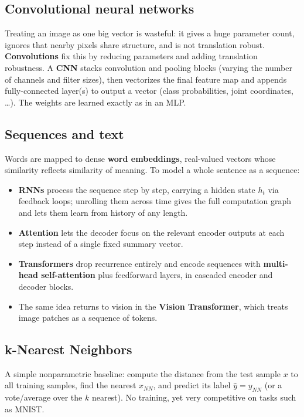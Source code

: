 \subsection{Convolutional neural networks}
Treating an image as one big vector is wasteful: it gives a huge parameter
count, ignores that nearby pixels share structure, and is not translation
robust. \textbf{Convolutions} fix this by reducing parameters and adding
translation robustness. A \textbf{CNN} stacks convolution and pooling blocks
(varying the number of channels and filter sizes), then vectorizes the final
feature map and appends fully-connected layer(s) to output a vector (class
probabilities, joint coordinates, \dots). The weights are learned exactly as in
an MLP.

\subsection{Sequences and text}
Words are mapped to dense \textbf{word embeddings}, real-valued vectors whose
similarity reflects similarity of meaning. To model a whole sentence as a
sequence:
\begin{itemize}
  \item \textbf{RNNs} process the sequence step by step, carrying a hidden state
  $h_t$ via feedback loops; unrolling them across time gives the full
  computation graph and lets them learn from history of any length.
  \item \textbf{Attention} lets the decoder focus on the relevant encoder
  outputs at each step instead of a single fixed summary vector.
  \item \textbf{Transformers} drop recurrence entirely and encode sequences with
  \textbf{multi-head self-attention} plus feedforward layers, in cascaded
  encoder and decoder blocks.
  \item The same idea returns to vision in the \textbf{Vision Transformer}, which
  treats image patches as a sequence of tokens.
\end{itemize}

\subsection{k-Nearest Neighbors}
A simple nonparametric baseline: compute the distance from the test sample $x$
to all training samples, find the nearest $x_{NN}$, and predict its label
$\hat{y} = y_{NN}$ (or a vote/average over the $k$ nearest). No training, yet
very competitive on tasks such as MNIST.

